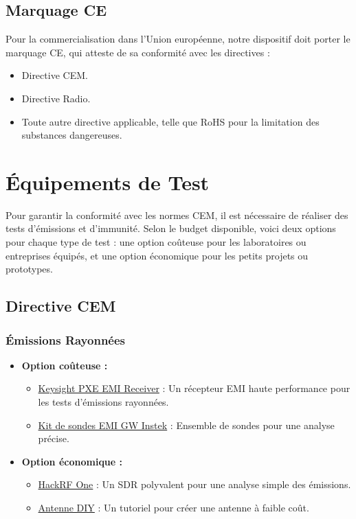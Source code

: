 \documentclass[a4paper,12pt]{article}
\begin{document}
\subsection{Marquage CE}
Pour la commercialisation dans l'Union européenne, notre dispositif doit porter le marquage CE, qui atteste de sa conformité avec les directives :
\begin{itemize}
    \item Directive CEM.
    \item Directive Radio.
    \item Toute autre directive applicable, telle que RoHS pour la limitation des substances dangereuses.
\end{itemize}

\newpage

\section{Équipements de Test}
Pour garantir la conformité avec les normes CEM, il est nécessaire de réaliser des tests d’émissions et d’immunité. Selon le budget disponible, voici deux options pour chaque type de test : une option coûteuse pour les laboratoires ou entreprises équipés, et une option économique pour les petits projets ou prototypes.

\subsection{Directive CEM}
\subsubsection{Émissions Rayonnées}
\begin{itemize}
    \item \textbf{Option coûteuse :}
          \begin{itemize}
              \item \href{https://www.keysight.com/us/en/product/N9048B/pxe-emi-receiver-1-hz-44-ghz.html}{Keysight PXE EMI Receiver} : Un récepteur EMI haute performance pour les tests d'émissions rayonnées.
              \item \href{https://eleshop.fr/gw-instek-gkt-008-emi-probe-kit.html}{Kit de sondes EMI GW Instek} : Ensemble de sondes pour une analyse précise.
          \end{itemize}
    \item \textbf{Option économique :}
          \begin{itemize}
              \item \href{https://greatscottgadgets.com/hackrf/one/}{HackRF One} : Un SDR polyvalent pour une analyse simple des émissions.
              \item \href{https://www.youtube.com/watch?v=2xy3Hm1_ZqI}{Antenne DIY} : Un tutoriel pour créer une antenne à faible coût.
          \end{itemize}
\end{itemize}
\end{document}
